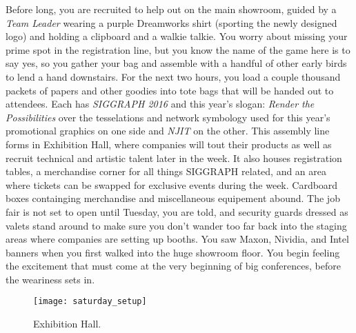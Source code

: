 \documentclass[../main.tex]{subfiles}
\begin{document}
Before long, you are recruited to help out on the main showroom, guided by a \textit{Team Leader} wearing a purple Dreamworks shirt (sporting the newly designed logo) and holding a clipboard and a walkie talkie. You worry about missing your prime spot in the registration line, but you know the name of the game here is to say yes, so you gather your bag and assemble with a handful of other early birds to lend a hand downstairs. For the next two hours, you load a couple thousand packets of papers and other goodies into tote bags that will be handed out to attendees. Each has \textit{SIGGRAPH 2016} and this year's slogan: \textit{Render the Possibilities} over the tesselations and network symbology used for this year's promotional graphics on one side and \textit{NJIT} on the other. This assembly line forms in Exhibition Hall, where companies will tout their products as well as recruit technical and artistic talent later in the week. It also houses registration tables, a merchandise corner for all things SIGGRAPH related, and an area where tickets can be swapped for exclusive events during the week. Cardboard boxes containging merchandise and miscellaneous equipement abound. The job fair is not set to open until Tuesday, you are told, and security guards dressed as valets stand around to make sure you don't wander too far back into the staging areas where companies are setting up booths. You saw Maxon, Nividia, and Intel banners when you first walked into the huge showroom floor. You begin feeling the excitement that must come at the very beginning of big conferences, before the weariness sets in.

\begin{figure}[h]
	\centering
	\texttt{[image: saturday\_setup]}
	\caption*{Exhibition Hall.}
\end{figure}
\end{document}
